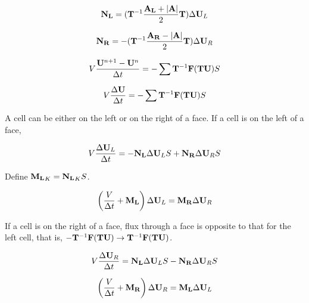 \documentclass{article}
\begin{document}
\begin{equation}
    \mathbf{N_L}
    =
    (\mathbf{T}^{-1}\frac{\mathbf{A_L} + \lvert\mathbf{A}\rvert}{2}\mathbf{T})\Delta\mathbf{U}_L
\end{equation}

\begin{equation}
    \mathbf{N_R}
    =
    -(\mathbf{T}^{-1}\frac{\mathbf{A_R} - \lvert\mathbf{A}\rvert}{2}\mathbf{T})\Delta\mathbf{U}_R
\end{equation}

\begin{equation}
    V\frac{\mathbf{U}^{n+1} - \mathbf{U}^{n}}{\Delta t}
    =
    -\sum\mathbf{T}^{-1}\mathbf{F}(\mathbf{T}\mathbf{U})S
\end{equation}

\begin{equation}
    V\frac{\Delta\mathbf{U}}{\Delta t}
    =
    -\sum\mathbf{T}^{-1}\mathbf{F}(\mathbf{T}\mathbf{U})S
\end{equation}

A cell can be either on the left or on the right of a face. If a cell is on the left of a face,

\begin{equation}
    V\frac{\Delta\mathbf{U}_L}{\Delta t}
    =
    -\mathbf{N_L}\Delta\mathbf{U}_LS
    +
    \mathbf{N_R}\Delta\mathbf{U}_RS
\end{equation}

Define $\mathbf{M_L}_K = \mathbf{N_L}_K S$.

\begin{equation}
    \left(
        \frac{V}{\Delta t} + \mathbf{M_L}
    \right)
    \Delta\mathbf{U}_L
    =
    \mathbf{M_R}\Delta\mathbf{U}_R
\end{equation}

If a cell is on the right of a face, flux through a face is opposite to that for the left cell, that is, $-\mathbf{T}^{-1}\mathbf{F}(\mathbf{T}\mathbf{U}) \rightarrow \mathbf{T}^{-1}\mathbf{F}(\mathbf{T}\mathbf{U})$.

\begin{equation}
    V\frac{\Delta\mathbf{U}_R}{\Delta t}
    =
    \mathbf{N_L}\Delta\mathbf{U}_LS
    -
    \mathbf{N_R}\Delta\mathbf{U}_RS
\end{equation}

\begin{equation}
    \left(
        \frac{V}{\Delta t} + \mathbf{M_R}
    \right)
    \Delta\mathbf{U}_R
    =
    \mathbf{M_L}\Delta\mathbf{U}_L
\end{equation}
\end{document}

